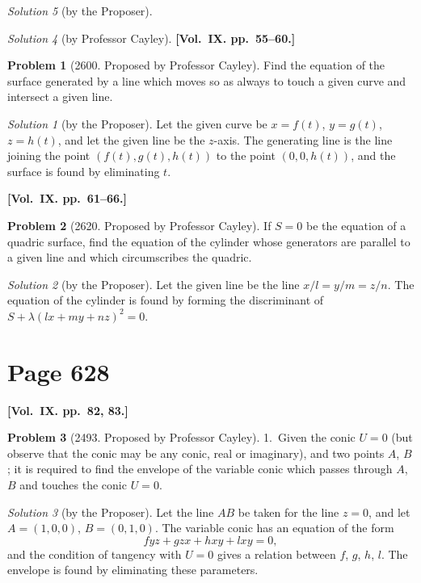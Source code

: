 \documentclass[12pt,a4paper]{article}
\theoremstyle{plain}
\theoremstyle{definition}
\newtheorem{problem}{Problem}
\theoremstyle{remark}
\newtheorem*{solution}{Solution}
\begin{document}
\begin{solution}[by the Proposer]
\begin{solution}[by Professor Cayley]
\medskip\noindent\textbf{[Vol.~IX. pp.~55--60.]}

\begin{problem}[2600. Proposed by Professor Cayley]
Find the equation of the surface generated by a line which moves so as always to touch a given curve and intersect a given line.
\end{problem}

\begin{solution}[by the Proposer]
Let the given curve be $x = f(t)$, $y = g(t)$, $z = h(t)$, and let the given line be the $z$-axis. The generating line is the line joining the point $(f(t), g(t), h(t))$ to the point $(0, 0, h(t))$, and the surface is found by eliminating $t$.
\end{solution}

\medskip\noindent\textbf{[Vol.~IX. pp.~61--66.]}

\begin{problem}[2620. Proposed by Professor Cayley]
If $S = 0$ be the equation of a quadric surface, find the equation of the cylinder whose generators are parallel to a given line and which circumscribes the quadric.
\end{problem}

\begin{solution}[by the Proposer]
Let the given line be the line $x/l = y/m = z/n$. The equation of the cylinder is found by forming the discriminant of $S + \lambda(lx + my + nz)^2 = 0$.
\end{solution}

\section*{Page 628}
\setcounter{page}{628}

\medskip\noindent\textbf{[Vol.~IX. pp.~82, 83.]}

\begin{problem}[2493. Proposed by Professor Cayley]
1.~Given the conic $U = 0$ (but observe that the conic may be any conic, real or imaginary), and two points $A$, $B$; it is required to find the envelope of the variable conic which passes through $A$, $B$ and touches the conic $U = 0$.
\end{problem}

\begin{solution}[by the Proposer]
Let the line $AB$ be taken for the line $z = 0$, and let $A = (1, 0, 0)$, $B = (0, 1, 0)$. The variable conic has an equation of the form
\[
fyz + gzx + hxy + lxy = 0,
\]
and the condition of tangency with $U = 0$ gives a relation between $f$, $g$, $h$, $l$. The envelope is found by eliminating these parameters.
\end{solution}


\end{solution}
\end{solution}
\end{document}
